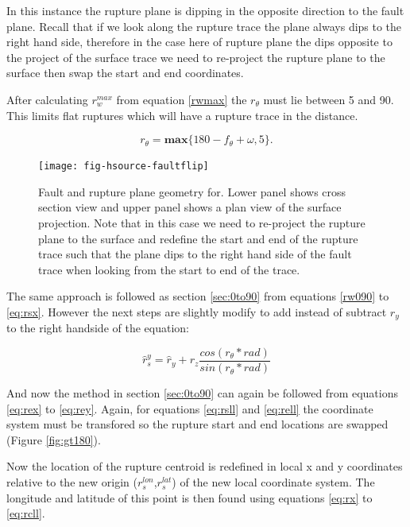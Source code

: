 In this instance the rupture plane is dipping in the opposite direction to the fault plane. Recall that if we look along 
the rupture trace the plane always dips to the right hand side, therefore in the case here of rupture plane the dips 
opposite to the project of the surface trace we need to re-project the rupture plane to the surface then swap the 
start and end coordinates. 



After calculating $r_w^{max}$ from equation \ref{rwmax} the $r_\theta$ must lie between 5 and 90. This limits flat ruptures which will have a rupture trace in the distance. 

\begin{equation}
r_\theta = \mathbf{max} \{ 180 - f_\theta + \omega, 5 \} .
\end{equation}



\begin{figure}[htp]
\centerline{\texttt{[image: fig-hsource-faultflip]}}
\caption{Fault and rupture plane geometry for. Lower panel shows cross section view and upper panel shows a plan view of the surface 
projection. Note that in this case we need to re-project the rupture plane to the surface and redefine the start and end of the 
rupture trace such that the plane dips to the right hand side of the fault trace when looking from the start to end of the trace.}
\label{fig:gt90}
\end{figure}


The same approach is followed as section \ref{sec:0to90} from equations \ref{rw090} to \ref{eq:rsx}. However the next steps are slightly 
modify to add instead of subtract $r_y$ to the right handside of the equation: 

\begin{equation}
\hat{r}_s^{y} = \hat{r}_y + r_z  \frac{cos(r_\theta * rad)}{sin(r_\theta * rad)}
\end{equation}

And now the method in section \ref{sec:0to90} can again be followed from equations \ref{eq:rex} to \ref{eq:rey}. 
Again, for equations \ref{eq:rsll} and \ref{eq:rell} the coordinate system must be transfored so the rupture start and end locations are swapped (Figure \ref{fig:gt180}).

Now the location of the rupture centroid is redefined in local x and y coordinates relative to the new 
origin ($r_s^{lon}$,$ r_s^{lat}$) of the new local coordinate system. The longitude and 
latitude of this point is then found using equations \ref{eq:rx} to \ref{eq:rcll}.

